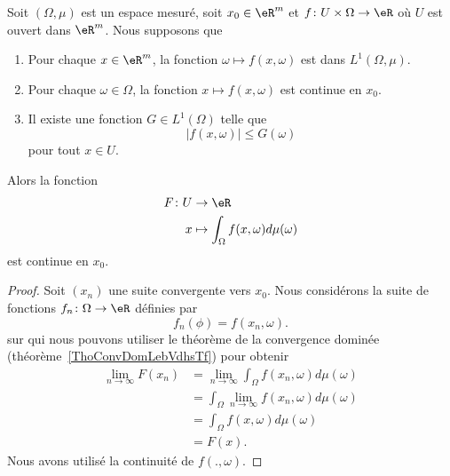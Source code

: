 \begin{theorem} \label{ThoKnuSNd}
	Soit \( (\Omega,\mu)\) est un espace mesuré, soit \( x_0\in \eR^m\) et \( f\colon U\times \Omega\to \eR\) où \( U\) est ouvert dans \( \eR^m\). Nous supposons que
	\begin{enumerate}
		\item
		      Pour chaque \( x\in \eR^m\), la fonction \( \omega\mapsto f(x,\omega)\) est dans \( L^1(\Omega,\mu)\).
		\item
		      Pour chaque \( \omega\in \Omega\), la fonction \( x\mapsto f(x,\omega)\) est continue en \( x_0\).
		\item       \label{ItemNAuYNG}
		      Il existe une fonction \( G\in L^1(\Omega)\) telle que
		      \begin{equation}
			      | f(x,\omega) |\leq G(\omega)
		      \end{equation}
		      pour tout \( x\in U\).
	\end{enumerate}
	Alors la fonction
	\begin{equation}
		\begin{aligned}
			F\colon U & \to \eR                                      \\
			x         & \mapsto \int_{\Omega}f(x,\omega)d\mu(\omega)
		\end{aligned}
	\end{equation}
	est continue en \( x_0\).
\end{theorem}

\begin{proof}
	Soit \( (x_n)\) une suite convergente vers \( x_0\). Nous considérons la suite de fonctions \( f_n\colon \Omega\to \eR\) définies par
	\begin{equation}
		f_n(\phi)=f(x_n,\omega).
	\end{equation}
	sur qui nous pouvons utiliser le théorème de la convergence dominée (théorème~\ref{ThoConvDomLebVdhsTf}) pour obtenir
	\begin{subequations}
		\begin{align}
			\lim_{n\to \infty} F(x_n) & =\lim_{n\to \infty} \int_{\Omega}f(x_n,\omega)d\mu(\omega) \\
			                          & =\int_{\Omega}\lim_{n\to \infty} f(x_n,\omega)d\mu(\omega) \\
			                          & =\int_{\Omega}f(x,\omega)d\mu(\omega)                      \\
			                          & =F(x).
		\end{align}
	\end{subequations}
	Nous avons utilisé la continuité de \( f(.,\omega)\).
\end{proof}

